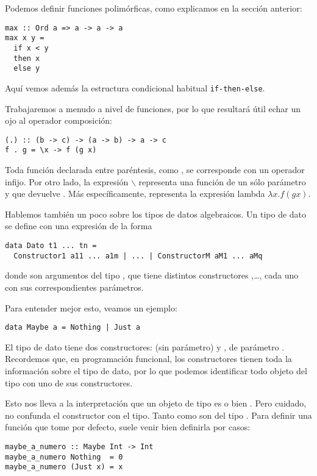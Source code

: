 Podemos definir funciones polimórficas, como explicamos en la sección anterior:
\begin{verbatim}
max :: Ord a => a -> a -> a 
max x y =
  if x < y
  then x 
  else y
\end{verbatim}
Aquí vemos además la estructura condicional habitual \texttt{if-then-else}.

Trabajaremos a menudo a nivel de funciones, por lo que resultará útil echar un ojo al operador composición:
\begin{verbatim}
(.) :: (b -> c) -> (a -> b) -> a -> c
f . g = \x -> f (g x)
\end{verbatim}
Toda función declarada entre paréntesis, como , se corresponde con un operador infijo.
Por otro lado, la expresión $\backslash$ representa una función de un sólo parámetro  y que devuelve .
Más específicamente, representa la expresión lambda $\lambda x. f(g x)$.

Hablemos también un poco sobre los tipos de datos algebraicos.
Un tipo de dato se define con una expresión de la forma
\begin{verbatim}
data Dato t1 ... tn = 
  Constructor1 a11 ... a1m | ... | ConstructorM aM1 ... aMq
\end{verbatim}
donde  son argumentos del tipo , que tiene distintos constructores ,\dots,  cada uno con sus correspondientes parámetros.

Para entender mejor esto, veamos un ejemplo:
\begin{verbatim}
data Maybe a = Nothing | Just a
\end{verbatim}
El tipo de dato  tiene dos constructores:  (sin parámetro) y , de parámetro .
Recordemos que, en programación funcional, los constructores tienen toda la información sobre el tipo de dato, por lo que podemos identificar todo objeto del tipo  con uno de sus constructores.

Esto nos lleva a la interpretación que un objeto de tipo  es  o bien .
Pero cuidado, no confunda el constructor con el tipo.
Tanto  como  son del tipo .
Para definir una función que tome  por defecto, suele venir bien definirla por casos:
\begin{verbatim}
maybe_a_numero :: Maybe Int -> Int
maybe_a_numero Nothing  = 0
maybe_a_numero (Just x) = x
\end{verbatim}

